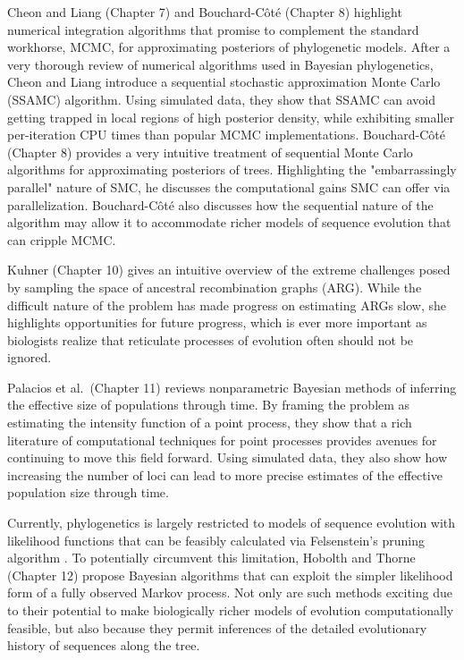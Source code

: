 \documentclass[letterpaper,12pt]{article}
\begin{document}
Cheon and Liang (Chapter 7) and Bouchard-C\^{o}t\'{e} (Chapter 8) highlight
numerical integration algorithms that promise to complement the standard
workhorse, MCMC, for approximating posteriors of phylogenetic models.
After a very thorough review of numerical algorithms used in Bayesian
phylogenetics, Cheon and Liang introduce a sequential stochastic approximation
Monte Carlo (SSAMC) \citep{Liang2007,Cheon2008} algorithm.
Using simulated data, they show that SSAMC can avoid getting trapped in local
regions of high posterior density, while exhibiting smaller per-iteration CPU
times than popular MCMC implementations.
Bouchard-C\^{o}t\'{e} (Chapter 8) provides a very intuitive treatment of
sequential Monte Carlo algorithms for approximating posteriors of trees.
Highlighting the "embarrassingly parallel" nature of SMC, he discusses
the computational gains SMC can offer via parallelization.
Bouchard-C\^{o}t\'{e} also discusses how the sequential nature of the
algorithm may allow it to accommodate richer models of sequence evolution
that can cripple MCMC.

Kuhner (Chapter 10) gives an intuitive overview of the extreme challenges
posed by sampling the space of ancestral recombination graphs (ARG).
While the difficult nature of the problem has made progress on estimating
ARGs slow, she highlights opportunities for future progress, which is ever more
important as biologists realize that reticulate processes of evolution
often should not be ignored.

Palacios et al.\ (Chapter 11) reviews nonparametric Bayesian methods of
inferring the effective size of populations through time. By framing
the problem as estimating the intensity function of a point process,
they show that a rich literature of computational techniques
for point processes provides avenues for continuing to move
this field forward.
Using simulated data, they also show how increasing the number of loci can lead
to more precise estimates of the effective population size through time.

Currently, phylogenetics is largely restricted to models of sequence evolution
with likelihood functions that can be feasibly calculated via Felsenstein's
pruning algorithm \citep{Felsenstein1981}.
To potentially circumvent this limitation, Hobolth and Thorne (Chapter 12)
propose Bayesian algorithms that can exploit the simpler likelihood form
of a fully observed Markov process.
Not only are such methods exciting due to their potential to make biologically
richer models of evolution computationally feasible, 
but also because they permit inferences of the detailed evolutionary history
of sequences along the tree.
\end{document}
